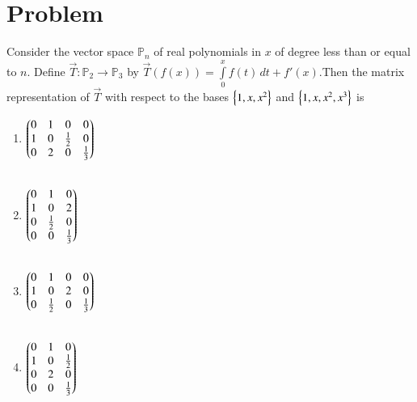\documentclass[journal,12pt]{IEEEtran}
\begin{document}
\section{\textbf{Problem}}
Consider the vector space $\mathbb{P}_{n}$ of real polynomials in ${x}$ of degree less than or equal to ${n}$. Define $\vec{T} : \mathbb{P}_{2}\rightarrow \mathbb{P}_{3}$ by $\vec{T}(f(x))=\int\limits_0^xf(t)\,dt+f'(x)$.Then the matrix  representation of $\vec{T}$ with respect to the bases $\left\{1,x,x^2\right\}$ and $\left\{1,x,x^2,x^3\right\}$ is \\
\begin{enumerate}
\item  $\begin{pmatrix}0&1&0&0\\1&0&\frac{1}{2}&0\\0&2&0&\frac{1}{3}\end{pmatrix}$\\\\
\item $\begin{pmatrix}0&1&0\\1&0&2\\0&\frac{1}{2}&0\\0&0&\frac{1}{3}\end{pmatrix}$ \\\\
\item  $\begin{pmatrix}0&1&0&0\\1&0&2&0\\0&\frac{1}{2}&0&\frac{1}{3}\end{pmatrix}$ \\\\
\item $\begin{pmatrix}0&1&0\\1&0&\frac{1}{2}\\0&2&0\\0&0&\frac{1}{3}\end{pmatrix}$ 
\end{enumerate}
\end{document}
